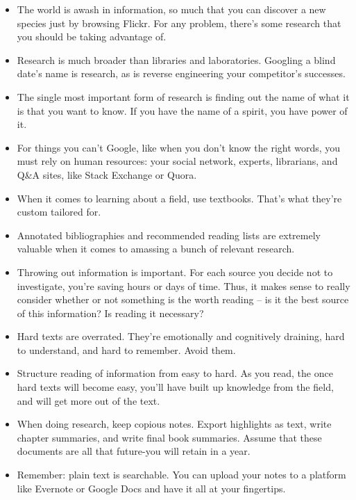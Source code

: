 \begin{itemize}
\item The world is awash in information, so much that you can discover a new species
just by browsing Flickr. For any problem, there's some research that you should
be taking advantage of.

\item Research is much broader than libraries and laboratories. Googling a blind
date's name is research, as is reverse engineering your competitor's successes.

\item The single most important form of research is finding out the name of what it
is that you want to know. If you have the name of a spirit, you have power of
it.

\item For things you can't Google, like when you don't know the right words, you
must rely on human resources: your social network, experts, librarians, and Q\&A
sites, like Stack Exchange or Quora.

\item When it comes to learning about a field, use textbooks. That's what they're
custom tailored for.

\item Annotated bibliographies and recommended reading lists are extremely valuable
when it comes to amassing a bunch of relevant research.

\item Throwing out information is important. For each source you decide not to
investigate, you're saving hours or days of time. Thus, it makes sense to really
consider whether or not something is the worth reading -- is it the best source
of this information? Is reading it necessary?

\item Hard texts are overrated. They're emotionally and cognitively draining, hard to
understand, and hard to remember. Avoid them.

\item Structure reading of information from easy to hard. As you read, the once hard
texts will become easy, you'll have built up knowledge from the field, and will
get more out of the text.

\item When doing research, keep copious notes. Export highlights as text, write
chapter summaries, and write final book summaries. Assume that these documents
are all that future-you will retain in a year.

\item Remember: plain text is searchable. You can upload your notes to a platform
like Evernote or Google Docs and have it all at your fingertips.
\end{itemize}

